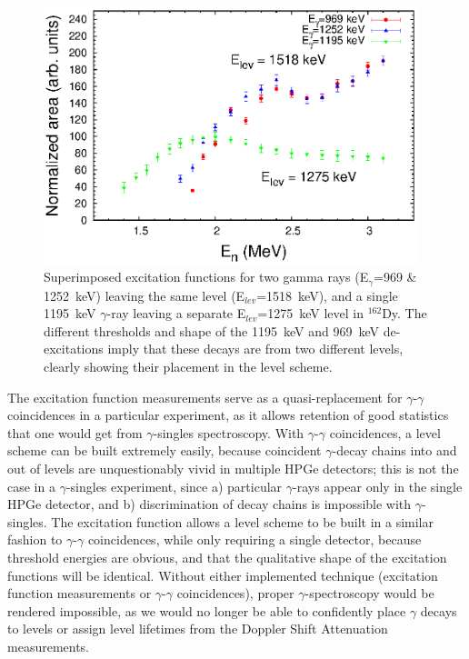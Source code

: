 \begin{figure}[h] 
\begin{center}
\includegraphics[width=0.97\textwidth]{figures/matching_exf.eps}
\caption{Superimposed excitation functions for two gamma rays (E$_\gamma$=969 \& 1252~keV) leaving the same level (E$_{lev}$=1518~keV), and a single 1195~keV $\gamma$-ray leaving a separate E$_{lev}$=1275~keV level in $^{162}$Dy. The different thresholds and shape of the 1195~keV and 969~keV de-excitations imply that these decays are from two different levels, clearly showing their placement in the level scheme.}
\label{fig:matching_exf}
\end{center}
\end{figure}

The excitation function measurements serve as a quasi-replacement for $\gamma$-$\gamma$ coincidences in a particular experiment, as it allows retention of good statistics that one would get from $\gamma$-singles spectroscopy. With $\gamma$-$\gamma$ coincidences, a level scheme can be built extremely easily, because coincident $\gamma$-decay chains into and out of levels are unquestionably vivid in multiple HPGe detectors; this is not the case in a $\gamma$-singles experiment, since a) particular $\gamma$-rays appear only in the single HPGe detector, and b) discrimination of decay chains is impossible with $\gamma$-singles. The excitation function allows a level scheme to be built in a similar fashion to $\gamma$-$\gamma$ coincidences, while only requiring a single detector, because threshold energies are obvious, and that the qualitative shape of the excitation functions will be identical. Without either implemented technique (excitation function measurements or $\gamma$-$\gamma$ coincidences), proper $\gamma$-spectroscopy would be rendered impossible, as we would no longer be able to confidently place $\gamma$ decays to levels or assign level lifetimes from the Doppler Shift Attenuation measurements.
